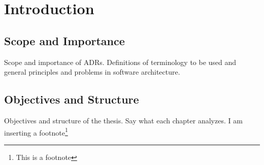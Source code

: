 \chapter{Introduction}
    \section{Scope and Importance}
        Scope and importance of ADRs. Definitions of terminology to be used and general principles and problems in software architecture.
    \section{Objectives and Structure}
        Objectives and structure of the thesis. Say what each chapter analyzes. I am inserting a footnote\footnote{This is a footnote}